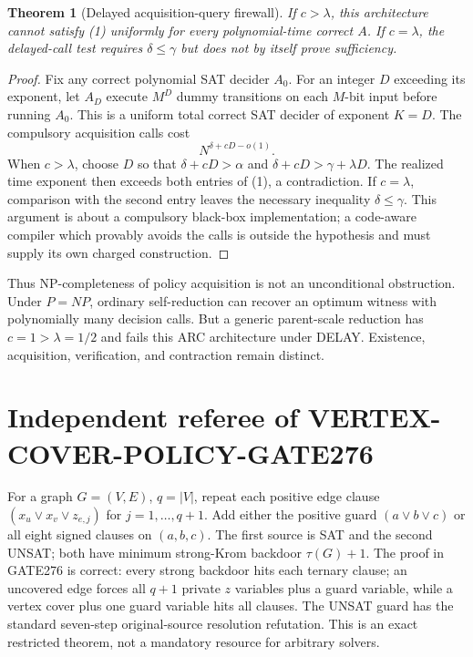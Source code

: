 \documentclass[11pt]{article}
\newtheorem{theorem}{Theorem}
\begin{document}
\begin{theorem}[Delayed acquisition-query firewall]
If $c>\lambda$, this architecture cannot satisfy (1) uniformly for every
polynomial-time correct $A$.  If $c=\lambda$, the delayed-call test requires
$\delta\le\gamma$ but does not by itself prove sufficiency.
\end{theorem}
\begin{proof}
Fix any correct polynomial SAT decider $A_0$.  For an integer $D$ exceeding
its exponent, let $A_D$ execute $M^D$ dummy transitions on each $M$-bit input
before running $A_0$.  This is a uniform total correct SAT decider of exponent
$K=D$.  The compulsory acquisition calls cost
\[
 N^{\delta+cD-o(1)}.
\]
When $c>\lambda$, choose $D$ so that
$\delta+cD>\alpha$ and
$\delta+cD>\gamma+\lambda D$.  The realized time exponent then exceeds both
entries of (1), a contradiction.  If $c=\lambda$, comparison with the second
entry leaves the necessary inequality $\delta\le\gamma$.  This argument is
about a compulsory black-box implementation; a code-aware compiler which
provably avoids the calls is outside the hypothesis and must supply its own
charged construction.
\end{proof}

Thus NP-completeness of policy acquisition is not an unconditional obstruction.
Under $P=NP$, ordinary self-reduction can recover an optimum witness with
polynomially many decision calls.  But a generic parent-scale reduction has
$c=1>\lambda=1/2$ and fails this ARC architecture under DELAY.  Existence,
acquisition, verification, and contraction remain distinct.

\section{Independent referee of VERTEX-COVER-POLICY-GATE276}
For a graph $G=(V,E)$, $q=|V|$, repeat each positive edge clause
$(x_u\vee x_v\vee z_{e,j})$ for $j=1,\ldots,q+1$.  Add either the positive
guard $(a\vee b\vee c)$ or all eight signed clauses on $(a,b,c)$.  The first
source is SAT and the second UNSAT; both have minimum strong-Krom backdoor
$\tau(G)+1$.  The proof in GATE276 is correct: every strong backdoor hits each
ternary clause; an uncovered edge forces all $q+1$ private $z$ variables plus
a guard variable, while a vertex cover plus one guard variable hits all
clauses.  The UNSAT guard has the standard seven-step original-source
resolution refutation.  This is an exact restricted theorem, not a mandatory
resource for arbitrary solvers.
\end{document}
